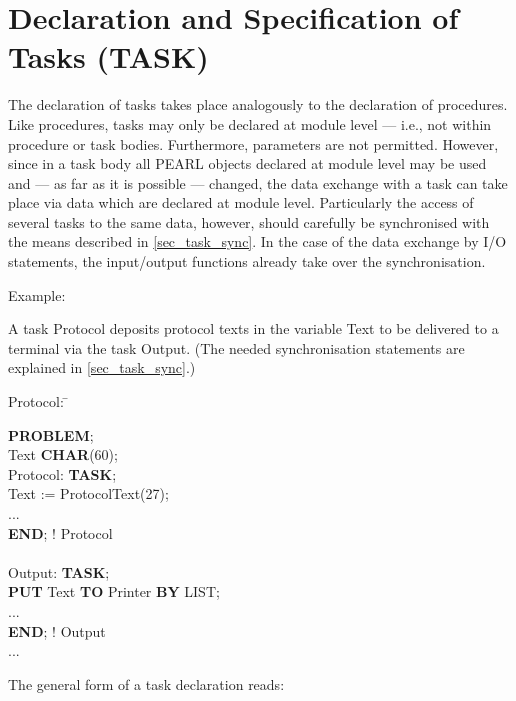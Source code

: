 \section{Declaration and Specification of Tasks (TASK)}   %
\label{sec_task_dcl}

The declaration of tasks takes place analogously to the declaration of
procedures.
Like procedures, tasks may only be declared at
module level --- i.e., not within procedure or task bodies. Furthermore,
parameters are not permitted. However, since in a task body all PEARL
objects declared at module level may be used and --- as far as it is
possible --- changed, the data exchange with a task can take place via
data which are declared at module level. Particularly the access of
several tasks to the same data, however, should carefully be
synchronised with the means described in \ref{sec_task_sync}. In the case of the data 
exchange by I/O statements, the input/output functions
already take over the synchronisation.

Example:

A task Protocol deposits protocol texts in the variable Text to be
delivered to a terminal via the task Output. (The needed synchronisation
statements are explained in \ref{sec_task_sync}.)

\begin{tabbing}
\x Protocol: \= \kill

{\bf PROBLEM}; \> \\
 Text {\bf CHAR}(60); \> \\
\x Protocol: \> {\bf TASK}; \\
      \> Text := ProtocolText(27);\\
      \> ... \\
      \> {\bf END}; ! Protocol \\
      \> \\
\x Output:   \> {\bf TASK}; \\
      \> {\bf PUT} Text {\bf TO} Printer {\bf BY} LIST;\\
      \> ... \\
      \> {\bf END}; ! Output\\
\x ...       \>
\end{tabbing}

The general form of a task declaration reads:



